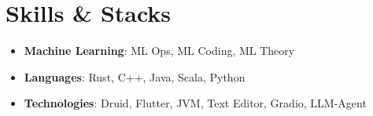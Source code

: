\documentclass[letterpaper,11pt]{article}
\makeatletter
\newcommand{\resumeItem}[2]{
  \item\small{
    \textbf{#1}{: #2 \vspace{-2pt}}
  }
}
\newcommand{\resumeSubheading}[4]{
  \vspace{-1pt}\item
    \begin{tabular*}{0.97\textwidth}[t]{l@{\extracolsep{\fill}}r}
      \textbf{#1} & #2 \\
      \textit{\small#3} & \textit{\small #4} \\
    \end{tabular*}\vspace{-5pt}
}
\newcommand{\resumeSubItem}[2]{\resumeItem{#1}{#2}\vspace{-4pt}}
\newcommand{\resumeSubHeadingListStart}{\begin{itemize}[leftmargin=*]}
\newcommand{\resumeSubHeadingListEnd}{\end{itemize}}
\newcommand{\resumeItemListStart}{\begin{itemize}}
\newcommand{\resumeItemListEnd}{\end{itemize}\vspace{-5pt}}
\makeatother
\begin{document}
%

 




\section{Skills \& Stacks}
  \resumeSubHeadingListStart
  
      \item{
      \textbf{Machine Learning}{: ML Ops, ML Coding, ML Theory}

    }
    
    \item{
      \textbf{Languages}{: Rust, C++, Java, Scala, Python}

    }
    
     \item{

      \textbf{Technologies}{: Druid, Flutter, JVM, Text Editor, Gradio, LLM-Agent}
    }
  \resumeSubHeadingListEnd
\end{document}
